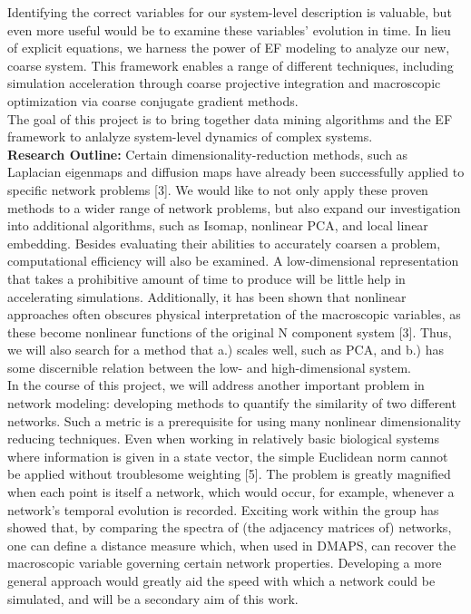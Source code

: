 \documentclass[11pt]{article}
\begin{document}
\indent Identifying the correct variables for our system-level description is valuable, but even more useful would be to examine these variables' evolution in time. In lieu of explicit equations, we harness the power of EF modeling to analyze our new, coarse system. This framework enables a range of different techniques, including simulation acceleration through coarse projective integration and macroscopic optimization via coarse conjugate gradient methods.\\
\indent The goal of this project is to bring together data mining algorithms and the EF framework to anlalyze system-level dynamics of complex systems.\\
\textbf{Research Outline:}  Certain dimensionality-reduction methods, such as Laplacian eigenmaps and diffusion maps have already been successfully applied to specific network problems [3]. We would like to not only apply these proven methods to a wider range of network problems, but also expand our investigation into additional algorithms, such as Isomap, nonlinear PCA, and local linear embedding. Besides evaluating their abilities to accurately coarsen a problem, computational efficiency will also be examined. A low-dimensional representation that takes a prohibitive amount of time to produce will be little help in accelerating simulations. Additionally, it has been shown that nonlinear approaches often obscures physical interpretation of the macroscopic variables, as these become nonlinear functions of the original N component system [3]. Thus, we will also search for a method that a.) scales well, such as PCA, and b.) has some discernible relation between the low- and high-dimensional system. \\
\indent In the course of this project, we will address another important problem in network modeling: developing methods to quantify the similarity of two different networks. Such a metric is a prerequisite for using many nonlinear dimensionality reducing techniques. Even when working in relatively basic biological systems where information is given in a state vector, the simple Euclidean norm cannot be applied without troublesome weighting [5]. The problem is greatly magnified when each point is itself a network, which would occur, for example, whenever a network's temporal evolution is recorded. Exciting work within the group has showed that, by comparing the spectra of (the adjacency matrices of) networks, one can define a distance measure which, when used in DMAPS, can recover the macroscopic variable governing certain network properties. Developing a more general approach would greatly aid the speed with which a network could be simulated, and will be a secondary aim of this work.\\
\end{document}
